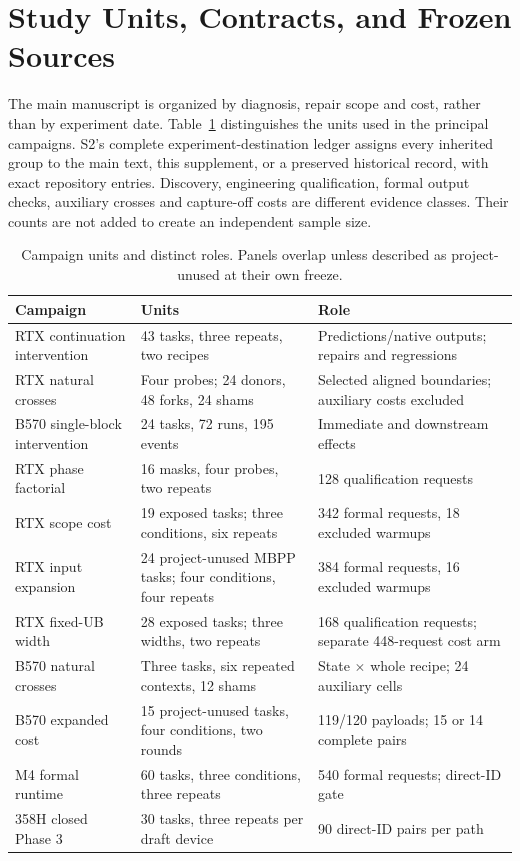 \section{Study Units, Contracts, and Frozen Sources}
\label{supp:scope}
The main manuscript is organized by diagnosis, repair scope and cost, rather than by experiment date. Table~\ref{tab:study_units} distinguishes the units used in the principal campaigns. S2's complete experiment-destination ledger assigns every inherited group to the main text, this supplement, or a preserved historical record, with exact repository entries. Discovery, engineering qualification, formal output checks, auxiliary crosses and capture-off costs are different evidence classes. Their counts are not added to create an independent sample size.

\begin{table}[ht]\centering\small
\caption{Campaign units and distinct roles. Panels overlap unless described as project-unused at their own freeze.}
\label{tab:study_units}
\begin{tabularx}{\linewidth}{@{}p{.30\linewidth}p{.25\linewidth}X@{}}\toprule
Campaign & Units & Role\\\midrule
RTX continuation intervention & 43 tasks, three repeats, two recipes & Predictions/native outputs; repairs and regressions\\
RTX natural crosses & Four probes; 24 donors, 48 forks, 24 shams & Selected aligned boundaries; auxiliary costs excluded\\
B570 single-block intervention & 24 tasks, 72 runs, 195 events & Immediate and downstream effects\\
RTX phase factorial & 16 masks, four probes, two repeats & 128 qualification requests\\
RTX scope cost & 19 exposed tasks; three conditions, six repeats & 342 formal requests, 18 excluded warmups\\
RTX input expansion & 24 project-unused MBPP tasks; four conditions, four repeats & 384 formal requests, 16 excluded warmups\\
RTX fixed-UB width & 28 exposed tasks; three widths, two repeats & 168 qualification requests; separate 448-request cost arm\\
B570 natural crosses & Three tasks, six repeated contexts, 12 shams & State $\times$ whole recipe; 24 auxiliary cells\\
B570 expanded cost & 15 project-unused tasks, four conditions, two rounds & 119/120 payloads; 15 or 14 complete pairs\\
M4 formal runtime & 60 tasks, three conditions, three repeats & 540 formal requests; direct-ID gate\\
358H closed Phase 3 & 30 tasks, three repeats per draft device & 90 direct-ID pairs per path\\\bottomrule
\end{tabularx}
\end{table}

